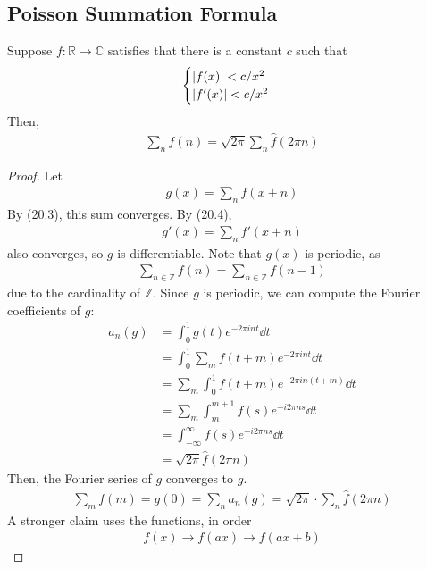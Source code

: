 \subsection{Poisson Summation Formula}
Suppose $f : \mathbb{R} \to \mathbb{C}$ satisfies that there is a constant $c$ such that
\begin{align}
    \begin{cases}
        \abs{f(x)} < c/x^2\\
        \abs{f'(x)} < c/x^2
    \end{cases}
\end{align}
Then,
\begin{align}
    \sum_n f(n) = \sqrt{2\pi} \sum_n \hat{f}(2\pi n)
\end{align}
\begin{proof}
    Let 
    \begin{align}
        g(x) = \sum_n f(x+n)
    \end{align}
    By (20.3), this sum converges. By (20.4),
    \begin{align}
        g'(x) = \sum_n f'(x+n)
    \end{align}
    also converges, so $g$ is differentiable. Note that $g(x)$ is periodic, as
    \begin{align}
        \sum_{n \in \mathbb{Z}} f(n) = \sum_{n \in \mathbb{Z}} f(n-1)
    \end{align}
    due to the cardinality of $\mathbb{Z}$. Since $g$ is periodic, we can compute the Fourier coefficients of $g$:
    \begin{align}
        a_n(g) &= \int_0^1 g(t) e^{-2\pi in t} \dd{t}\\
        &= \int_0^1 \sum_m f(t+m) e^{-2\pi in t} \dd{t}\\
        &= \sum_m \int_0^1 f(t+m) e^{-2\pi in (t+m)} \dd{t}\\
        &= \sum_m \int_m^{m+1} f(s) e^{-i 2\pi n s} \dd{t}\\
        &= \int_{-\infty}^\infty f(s) e^{-i 2\pi n s} \dd{t}\\
        &= \sqrt{2\pi} \hat{f}(2\pi n)
    \end{align}
    Then, the Fourier series of $g$ converges to $g$.
    \begin{align}
        \sum_m f(m) = g(0) = \sum_n a_n(g) = \sqrt{2\pi} \cdot \sum_n \hat{f}(2\pi n)
    \end{align}
    A stronger claim uses the functions, in order
    \begin{align}
        f(x) \to f(ax) \to f(ax+b)
    \end{align}

\end{proof}
